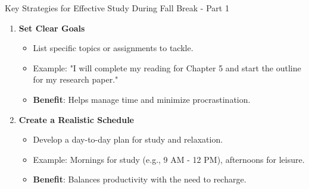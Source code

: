 \documentclass[aspectratio=169]{beamer}
\begin{document}
\begin{frame}[fragile]{Key Strategies for Effective Study During Fall Break - Part 1}
  \begin{enumerate}
    \item \textbf{Set Clear Goals}
      \begin{itemize}
        \item List specific topics or assignments to tackle.
        \item Example: "I will complete my reading for Chapter 5 and start the outline for my research paper."
        \item \textbf{Benefit}: Helps manage time and minimize procrastination.
      \end{itemize}

    \item \textbf{Create a Realistic Schedule}
      \begin{itemize}
        \item Develop a day-to-day plan for study and relaxation.
        \item Example: Mornings for study (e.g., 9 AM - 12 PM), afternoons for leisure.
        \item \textbf{Benefit}: Balances productivity with the need to recharge.
      \end{itemize}
  \end{enumerate}
\end{frame}
\end{document}
